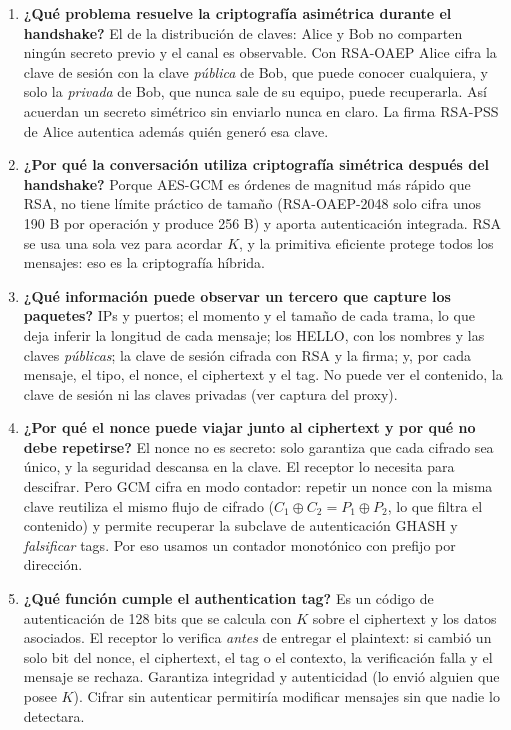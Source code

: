 \documentclass[11pt,a4paper]{article}
\begin{document}
\begin{enumerate}
\item \textbf{¿Qué problema resuelve la criptografía asimétrica durante el handshake?}
  El de la distribución de claves: Alice y Bob no comparten ningún secreto previo y el canal es
  observable. Con RSA-OAEP Alice cifra la clave de sesión con la clave \emph{pública} de Bob,
  que puede conocer cualquiera, y solo la \emph{privada} de Bob, que nunca sale de su equipo,
  puede recuperarla. Así acuerdan un secreto simétrico sin enviarlo nunca en claro. La firma
  RSA-PSS de Alice autentica además quién generó esa clave.

\item \textbf{¿Por qué la conversación utiliza criptografía simétrica después del handshake?}
  Porque AES-GCM es órdenes de magnitud más rápido que RSA, no tiene límite práctico de tamaño
  (RSA-OAEP-2048 solo cifra unos 190 B por operación y produce 256 B) y aporta autenticación
  integrada. RSA se usa una sola vez para acordar $K$, y la primitiva eficiente protege todos los
  mensajes: eso es la criptografía híbrida.

\item \textbf{¿Qué información puede observar un tercero que capture los paquetes?}
  IPs y puertos; el momento y el tamaño de cada trama, lo que deja inferir la longitud de cada
  mensaje; los HELLO, con los nombres y las claves \emph{públicas}; la clave de sesión cifrada
  con RSA y la firma; y, por cada mensaje, el tipo, el nonce, el ciphertext y el tag. No puede
  ver el contenido, la clave de sesión ni las claves privadas (ver captura del proxy).

\item \textbf{¿Por qué el nonce puede viajar junto al ciphertext y por qué no debe repetirse?}
  El nonce no es secreto: solo garantiza que cada cifrado sea único, y la seguridad descansa en
  la clave. El receptor lo necesita para descifrar. Pero GCM cifra en modo contador: repetir un
  nonce con la misma clave reutiliza el mismo flujo de cifrado ($C_1\oplus C_2 = P_1\oplus P_2$,
  lo que filtra el contenido) y permite recuperar la subclave de autenticación GHASH y
  \emph{falsificar} tags. Por eso usamos un contador monotónico con prefijo por dirección.

\item \textbf{¿Qué función cumple el authentication tag?}
  Es un código de autenticación de 128 bits que se calcula con $K$ sobre el ciphertext y los
  datos asociados. El receptor lo verifica \emph{antes} de entregar el plaintext: si cambió un
  solo bit del nonce, el ciphertext, el tag o el contexto, la verificación falla y el mensaje se
  rechaza. Garantiza integridad y autenticidad (lo envió alguien que posee $K$). Cifrar sin
  autenticar permitiría modificar mensajes sin que nadie lo detectara.


\end{enumerate}
\end{document}
